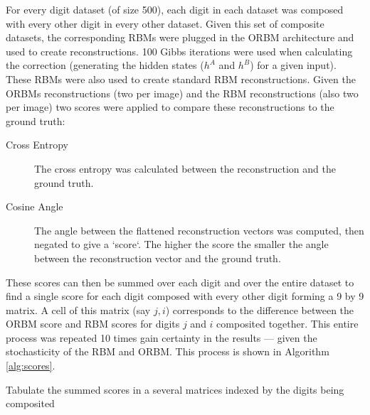     For every digit dataset (of size 500), each digit in each dataset was composed with every other digit in every other dataset. Given this set of composite datasets, the corresponding RBMs were plugged in the ORBM architecture and used to create reconstructions. 100 Gibbs iterations were used when calculating the correction (generating the hidden states ($h^A$ and $h^B$) for a given input). These RBMs were also used to create standard RBM reconstructions.
    Given the ORBMs reconstructions (two per image) and the RBM reconstructions (also two per image) two scores were applied to compare these reconstructions to the ground truth:
    \begin{description}
      \item[Cross Entropy] The cross entropy was calculated between the reconstruction and the ground truth.
      \item[Cosine Angle] The angle between the flattened reconstruction vectors was computed, then negated to give a `score`. The higher the score the smaller the angle between the reconstruction vector and the ground truth.
    \end{description}
    These scores can then be summed over each digit and over the entire dataset to find a single score for each digit composed with every other digit forming a 9 by 9 matrix. A cell of this matrix (say $j,i$) corresponds to the difference between the ORBM score and RBM scores for digits $j$ and $i$ composited together. This entire process was repeated 10 times gain certainty in the results --- given the stochasticity of the RBM and ORBM. This process is shown in Algorithm \ref{alg:scores}.

    \begin{algorithm}[!ht]

      {
       Tabulate the summed scores in a several matrices indexed by the digits being composited\;
     }
    \caption{Algorithm explaining how the Scores matrices were constructed.}\label{alg:scores}
    \end{algorithm}

